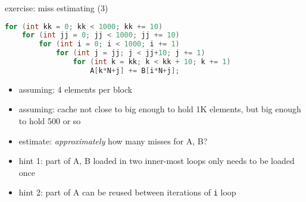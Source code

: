 \begin{frame}[fragile,label=exer]{exercise: miss estimating (3)}
\begin{lstlisting}[language=C++,style=small]
for (int kk = 0; kk < 1000; kk += 10)
    for (int jj = 0; jj < 1000; jj += 10)
        for (int i = 0; i < 1000; i += 1)
            for (int j = jj; j < jj+10; j += 1)
                for (int k = kk; k < kk + 10; k += 1)
                    A[k*N+j] += B[i*N+j];
\end{lstlisting}
\begin{itemize}
\item assuming: 4 elements per block
\item assuming: cache not close to big enough to hold 1K elements, but big enough to hold 500 or so
\vspace{.5cm}
\item estimate: \textit{approximately} how many misses for A, B?
\vspace{.5cm}
\item hint 1: part of A, B loaded in two inner-most loops only needs to be loaded once
\item hint 2: part of A can be reused between iterations of \texttt{i} loop
\end{itemize}
\end{frame}
